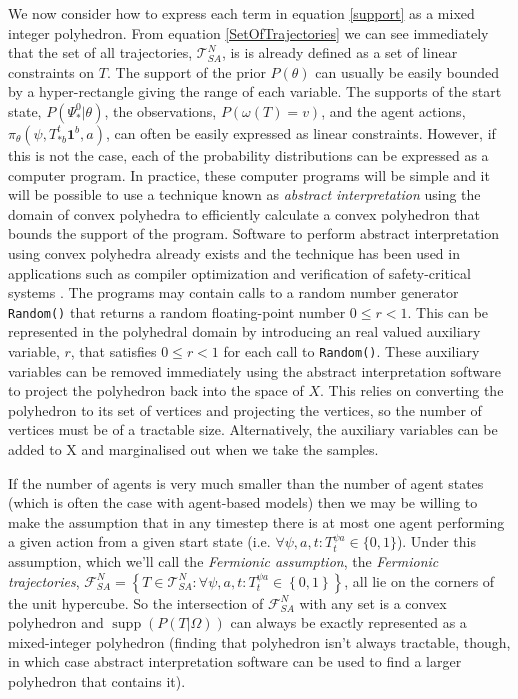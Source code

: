 \documentclass{article}
\DeclareMathOperator\supp{supp}
\begin{document}
We now consider how to express each term in equation \eqref{support} as a mixed integer polyhedron. From equation \eqref{SetOfTrajectories} we can see immediately that the set of all trajectories, $\mathcal{T}^N_{SA}$, is is already defined as a set of linear constraints on $T$. The support of the prior $P(\theta)$ can usually be easily bounded by a hyper-rectangle giving the range of each variable. The supports of the start state, $P(\Psi^0_*|\theta)$, the observations, $P(\omega(T)=v)$, and the agent actions, $\pi_\theta(\psi,T^t_{*b}\mathbf{1}^b,a)$, can often be easily expressed as linear constraints. However, if this is not the case, each of the probability distributions can be expressed as a computer program. In practice, these computer programs will be simple and it will be possible to use a technique known as \textit{abstract interpretation} \citep{cousot1977abstract} using the domain of convex polyhedra \citep*{cousot1978automatic, becchi2018efficient, fukuda2020polyhedral} to efficiently calculate a convex polyhedron that bounds the support of the program. Software to perform abstract interpretation using convex polyhedra already exists \citep*{henry2012pagai, GN2021, jeannet2009apron, bagnara2008parma} and the technique has been used in applications such as compiler optimization \citep{nsjodin2009design} and verification of safety-critical systems \citep{halbwachs1997verification}. The programs may contain calls to a random number generator \texttt{Random()} that returns a random floating-point number $0 \le r < 1$. This can be represented in the polyhedral domain by introducing an real valued auxiliary variable, $r$, that satisfies $0 \le r < 1$ for each call to \texttt{Random()}. These auxiliary variables can be removed immediately using the abstract interpretation software to project the polyhedron back into the space of $X$. This relies on converting the polyhedron to its set of vertices \citep{motzkin1953double} and projecting the vertices, so the number of vertices must be of a tractable size. Alternatively, the auxiliary variables can be added to X and marginalised out when we take the samples.

If the number of agents is very much smaller than the number of agent states (which is often the case with agent-based models) then we may be willing to make the assumption that in any timestep there is at most one agent performing a given action from a given start state (i.e. $\forall \psi, a, t: T^{\psi a}_t \in \{0,1\}$). Under this assumption, which we'll call the \textit{Fermionic assumption}, the \textit{Fermionic trajectories}, $\mathcal{F}^N_{SA} = \left\{T\in\mathcal{T}^N_{SA}: \forall \psi, a, t: T^{\psi a}_t \in \left\{0,1\right\}\right\}$, all lie on the corners of the unit hypercube. So the intersection of $\mathcal{F}^N_{SA}$ with any set is a convex polyhedron and $\supp(P(T|\Omega))$ can always be exactly represented as a mixed-integer polyhedron (finding that polyhedron isn't always tractable, though, in which case abstract interpretation software can be used to find a larger polyhedron that contains it).
\end{document}
